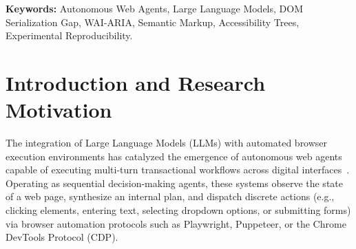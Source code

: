 \documentclass[11pt,a4paper]{article}
\begin{document}
\begin{abstract}
We establish a clean 3-arm Randomized Complete Block Design (RCBD) across six distinct e-commerce tasks and four temporal blocks ($N=72$ scheduled trials; 24 per arm) evaluating unaugmented baseline HTML (\textsc{ABS}), semantic accessibility markup (\textsc{ARIA}), and configured developer custom attributes (\textsc{DATA-CFG}) under strict single-variable control with vision disabled (\texttt{use\_vision=False}). We eliminate historical verifier vulnerabilities by implementing state-asserted ground-truth evaluations (including end-to-end checkout state mutations, seeded cart preconditions, and dual-pattern refusal scoring for an absent-information probe). In accordance with rigorous data-provenance standards, we report preliminary findings from 25 completed trials across two temporal blocks ($100\%$ balanced completion of Block~1). Across all 25 valid trials, the model (\texttt{gemini-3.1-flash-lite}) achieved $100\%$ task success, revealing an empirical ceiling effect where binary success cannot differentiate the arms ($\chi^2 = 0.000, p = 1.000$). Trajectory length analysis reveals no statistically significant difference in mean steps across arms ($F(2, 22) = 0.130, p = 0.879$), demonstrating that additive ARIA and data attributes did not enhance agent reasoning when human-visible text was already unambiguous. We document upstream infrastructure availability challenges (intermittent HTTP 503 capacity spikes resulting in 3 quarantined aborts on Run 26) and bound our conclusions within an exploratory pilot framework.
\end{abstract}

\textbf{Keywords:} Autonomous Web Agents, Large Language Models, DOM Serialization Gap, WAI-ARIA, Semantic Markup, Accessibility Trees, Experimental Reproducibility.

\section{Introduction and Research Motivation}
\label{sec:intro}

The integration of Large Language Models (LLMs) with automated browser execution environments has catalyzed the emergence of autonomous web agents capable of executing multi-turn transactional workflows across digital interfaces~\cite{zhou2024webarena, deng2023mind2web, drouin2024workarena}. Operating as sequential decision-making agents, these systems observe the state of a web page, synthesize an internal plan, and dispatch discrete actions (e.g., clicking elements, entering text, selecting dropdown options, or submitting forms) via browser automation protocols such as Playwright, Puppeteer, or the Chrome DevTools Protocol (CDP).
\end{document}
